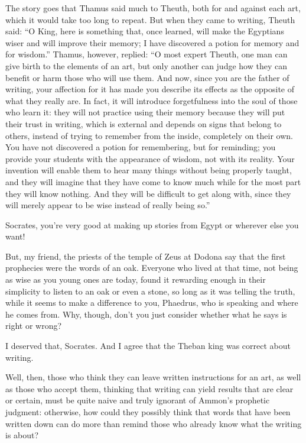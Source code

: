 The story goes that Thamus said much to Theuth, both for and against
each art, which it would take too long to repeat. But when they came to
writing, Theuth said: “O King, here is something that, once learned,
will make the Egyptians wiser and will improve their memory; I have
discovered a potion for memory and for wisdom.” Thamus, however,
replied: “O most expert Theuth, one man can give birth to the elements
of an art, but only another can judge how they can benefit or harm those
who will use them. And now, since you are the father of
writing, your affection for it has made you describe its effects as the
opposite of what they really are. In fact, it will introduce
forgetfulness into the soul of those who learn it: they will not
practice using their memory because they will put their trust in
writing, which is external and depends on signs that belong to others,
instead of trying to remember from the inside, completely on their own.
You have not discovered a potion for remembering, but for reminding; you
provide your students with the appearance of wisdom, not with its
reality. Your invention will enable them to hear many things without
being properly taught, and they will imagine that they have come
to know much while for the most part they will know nothing. And they
will be difficult to get along with, since they will merely appear to be
wise instead of really being so.”

\sayphaedrus Socrates, you’re very good at making up stories from Egypt or
wherever else you want!

\saysocrates But, my friend, the priests of the temple of Zeus at Dodona
say that the first prophecies were the words of an oak. Everyone who
lived at that time, not being as wise as you young ones are today, found
it rewarding enough in their simplicity to listen to an oak or even a
stone, so long as it was telling the truth, while it seems to
make a difference to you, Phaedrus, who is speaking and where he comes
from. Why, though, don’t you just consider whether what he says is right
or wrong?

\sayphaedrus I deserved that, Socrates. And I agree that the Theban king
was correct about writing.

\saysocrates Well, then, those who think they can leave written
instructions for an art, as well as those who accept them, thinking that
writing can yield results that are clear or certain, must be quite naive
and truly ignorant of Ammon’s prophetic judgment: otherwise, how could
they possibly think that words that have been written down can
do more than remind those who already know what the writing is about?

